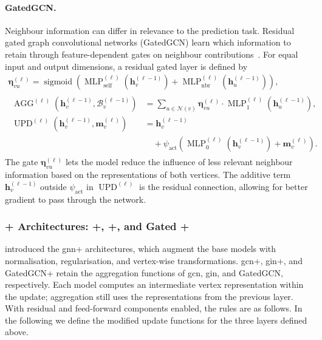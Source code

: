 \paragraph{GatedGCN.}
Neighbour information can differ in relevance to the prediction task. Residual gated graph convolutional networks (GatedGCN) learn which information to retain through feature-dependent gates on neighbour contributions~\citep{BreLau17}. For equal input and output dimensions, a residual gated layer is defined by
\begin{equation}
\label{eq:ch07:gated-gcn}
\begin{gathered}
    \boldsymbol\eta_{vu}^{(\ell)} = \operatorname{sigmoid}\!\left(
        \operatorname{MLP}_{\mathrm{self}}^{(\ell)}(\mathbf{h}_v^{(\ell-1)})+\operatorname{MLP}_{\mathrm{nbr}}^{(\ell)}(\mathbf{h}_u^{(\ell-1)})\right), \\
\begin{aligned}
    \operatorname{AGG}^{(\ell)}\!\left(\mathbf{h}_v^{(\ell-1)},\mathcal B_v^{(\ell-1)}\right)
        &=\sum_{u\in \mathcal N(v)}\boldsymbol\eta_{vu}^{(\ell)}\cdot \operatorname{MLP}_1^{(\ell)}\!\left(\mathbf{h}_u^{(\ell-1)}\right), \\
    \operatorname{UPD}^{(\ell)}\!\left(\mathbf{h}_v^{(\ell-1)},\mathbf{m}_v^{(\ell)}\right)
        &=\mathbf{h}_v^{(\ell-1)} \\
        &\quad+\psi_{\mathrm{act}}\!\left(\operatorname{MLP}_0^{(\ell)}\!\left(\mathbf{h}_v^{(\ell-1)}\right)+\mathbf{m}_v^{(\ell)}\right).
\end{aligned}
\end{gathered}
\end{equation}
The gate $\boldsymbol\eta_{vu}^{(\ell)}$ lets the model reduce the influence of less relevant neighbour information based on the representations of both vertices. The additive term $\mathbf{h}_v^{(\ell-1)}$ outside $\psi_{\mathrm{act}}$ in $\operatorname{UPD}^{(\ell)}$ is the residual connection, allowing for better gradient to pass through the network.

\subsubsection{+ Architectures: +, +, and Gated +}
\label{sec:ch07:gnn-plus}
\citet{LuoEtAl25} introduced the \gls{gnn}+ architectures, which augment the base models with normalisation, regularisation, and vertex-wise transformations. \gls{gcn}+, \gls{gin}+, and GatedGCN+ retain the aggregation functions of \gls{gcn}, \gls{gin}, and GatedGCN, respectively. Each model computes an intermediate vertex representation within the update; aggregation still uses the representations from the previous layer. With residual and feed-forward components enabled, the rules are as follows. In the following we define the modified update functions for the three layers defined above.

